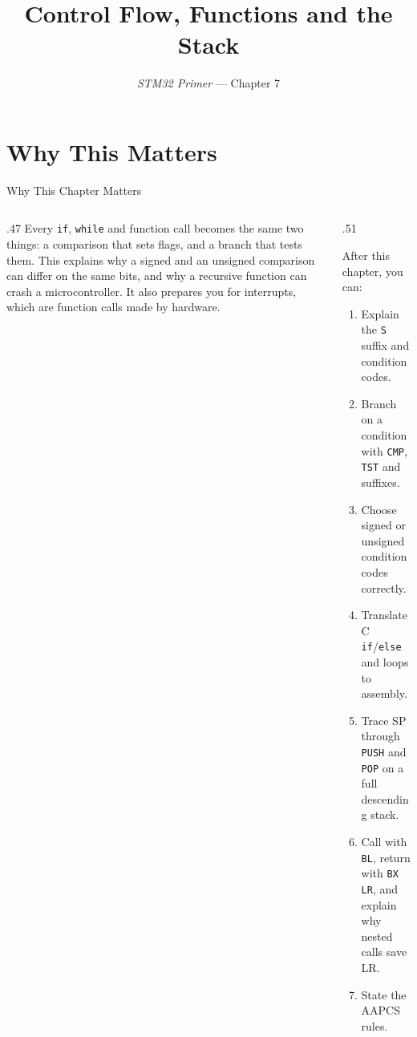 \documentclass[9pt,aspectratio=169,xcolor=table]{beamer}
\title{Control Flow, Functions and the Stack}
\subtitle{\emph{STM32 Primer} --- Chapter 7}
\begin{document}
\titlepage

\section{Why This Matters}

\begin{frame}{Why This Chapter Matters}
    \begin{columns}[T]
    \begin{column}{.47\textwidth}
        {\normalsize Every \texttt{if}, \texttt{while} and function call becomes the same two things: a comparison that sets flags, and a branch that tests them. This explains why a signed and an unsigned comparison can differ on the same bits, and why a recursive function can crash a microcontroller. It also prepares you for interrupts, which are function calls made by hardware.}
    \end{column}
    \begin{column}{.51\textwidth}
        \begin{block}{After this chapter, you can:}
        {\small
        \begin{enumerate}\itemsep2pt
            \item Explain the \texttt{S} suffix and condition codes.
            \item Branch on a condition with \texttt{CMP}, \texttt{TST} and suffixes.
            \item Choose signed or unsigned condition codes correctly.
            \item Translate C \texttt{if}/\texttt{else} and loops to assembly.
            \item Trace SP through \texttt{PUSH} and \texttt{POP} on a full descending stack.
            \item Call with \texttt{BL}, return with \texttt{BX LR}, and explain why nested calls save LR.
            \item State the AAPCS rules.
        \end{enumerate}}
        \end{block}
    \end{column}
    \end{columns}
\end{frame}
\end{document}
